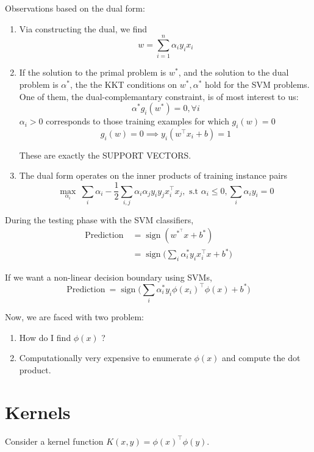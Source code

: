 Observations based on the dual form:
\begin{enumerate}
  \item Via constructing the dual, we find
        $$
          \boxed{w = \sum_{i=1}^n \alpha_iy_ix_i}
        $$
  \item If the solution to the primal problem is $w^*$, and the solution to the dual problem is $\alpha^*$, the the KKT conditions on $w^*,\alpha^*$ hold for the SVM problems. One of them, the dual-complemantary constraint, is of most interest to us:
        $$
          \boxed{\alpha^* g_i(w^*) = 0, \forall i}
        $$
        $\alpha_i > 0$ corresponds to those training examples for which $g_i(w) = 0$
        $$
          g_i(w) = 0 \implies y_i(w^\top x_i + b) = 1
        $$

        These are exactly the SUPPORT VECTORS.

  \item The dual form operates on the inner products of training instance pairs
        $$
          \underset{\alpha_i}{\operatorname{max}} \ \sum_i \alpha_i - \frac{1}{2} \sum_{i,j} {\alpha_i\alpha_jy_iy_jx_i^\top x_j}, \text{ s.t } \alpha_i \leq 0, \sum_i{\alpha_iy_i} = 0
        $$
\end{enumerate}

During the testing phase with the SVM classifiers,
\begin{align*}
  \text{Prediction} \  & = \operatorname{sign}(w^{*^\top}x + b^*)                                 \\
                       & = \operatorname{sign}\bigg(\sum_i{\alpha_i^* y_i x_i^\top x} + b^*\bigg)
\end{align*}

If we want a non-linear decision boundary using SVMs,
$$
  \text{Prediction} \ = \operatorname{sign}\bigg(\sum_i{\alpha_i^* y_i \phi(x_i)^\top \phi(x)} + b^*\bigg)
$$

Now, we are faced with two problem:
\begin{enumerate}
  \item How do I find $\phi(x)$ ?
  \item Computationally very expensive to enumerate $\phi(x)$ and compute the dot product.
\end{enumerate}

\section{Kernels}
Consider a kernel function $K(x,y) = \phi(x)^\top \phi(y)$. \\

